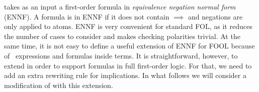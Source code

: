 \newcnf{} takes as an input a first-order formula in \emph{equivalence negation normal form} (ENNF). A formula is in ENNF if it does not contain $\implies$ and negations are only applied to atoms. ENNF is very convenient for
standard FOL, as it reduces the number of cases to consider and makes checking polarities trivial. At the same time, it is not easy to define a useful extension of ENNF for FOOL because of \LETIN\ expressions and formulas inside terms. It is straightforward, however, to extend \newcnf{} in order to support formulas in full first-order logic. For that, we need to add an extra rewriting rule for implications. In what follows we will consider a modification of \newcnf{} with this extension.